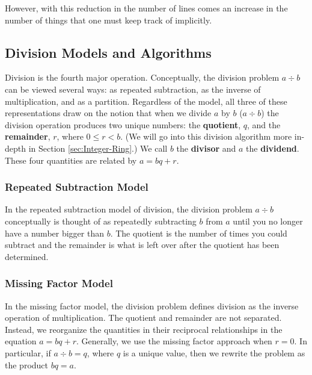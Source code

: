 \documentclass[
]{book}
\theoremstyle{definition}
\theoremstyle{definition}
\theoremstyle{definition}
\theoremstyle{definition}
\theoremstyle{remark}
\begin{document}
However, with this reduction in the number of lines comes an increase in the number of things that one must keep track of implicitly.

\hypertarget{division-models-and-algorithms}{%
\subsection{Division Models and Algorithms}\label{division-models-and-algorithms}}

Division is the fourth major operation. Conceptually, the division problem \(a \div b\) can be viewed several ways: as repeated subtraction, as the inverse of multiplication, and as a partition. Regardless of the model, all three of these representations draw on the notion that when we divide \(a\) by \(b\) (\(a\div b\)) the division operation produces two unique numbers: the \textbf{quotient}, \(q\), and the \textbf{remainder}, \(r\), where \(0\leq r <b\). (We will go into this division algorithm more in-depth in Section \ref{sec:Integer-Ring}.) We call \(b\) the \textbf{divisor} and \(a\) the \textbf{dividend}. These four quantities are related by \(a=bq+r\).

\hypertarget{repeated-subtraction-model}{%
\subsubsection*{Repeated Subtraction Model}\label{repeated-subtraction-model}}

In the repeated subtraction model of division, the division problem \(a\div b\) conceptually is thought of as repeatedly subtracting \(b\) from \(a\) until you no longer have a number bigger than \(b\). The quotient is the number of times you could subtract and the remainder is what is left over after the quotient has been determined.

\hypertarget{missing-factor-model}{%
\subsubsection*{Missing Factor Model}\label{missing-factor-model}}

In the missing factor model, the division problem defines division as the inverse operation of multiplication. The quotient and remainder are not separated. Instead, we reorganize the quantities in their reciprocal relationships in the equation \(a=bq+r\). Generally, we use the missing factor approach when \(r=0\). In particular, if \(a\div b = q\), where \(q\) is a unique value, then we rewrite the problem as the product \(bq=a\).
\end{document}
